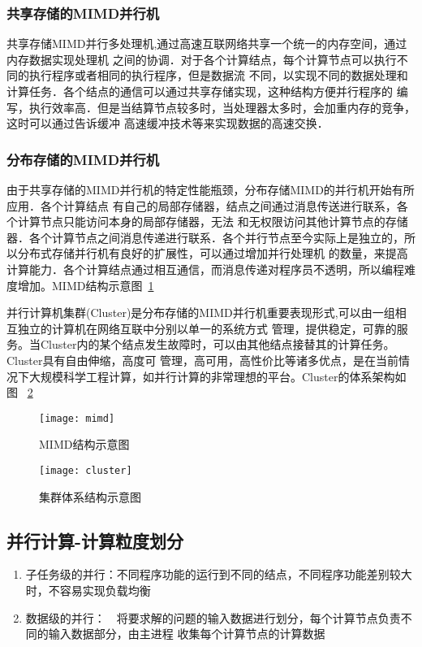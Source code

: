 \subsubsection{共享存储的MIMD并行机}
    共享存储MIMD并行多处理机,通过高速互联网络共享一个统一的内存空间，通过内存数据实现处理机
之间的协调．对于各个计算结点，每个计算节点可以执行不同的执行程序或者相同的执行程序，但是数据流
不同，以实现不同的数据处理和计算任务．各个结点的通信可以通过共享存储实现，这种结构方便并行程序的
编写，执行效率高．但是当结算节点较多时，当处理器太多时，会加重内存的竞争，这时可以通过告诉缓冲
高速缓冲技术等来实现数据的高速交换．
\subsubsection{分布存储的MIMD并行机}
    由于共享存储的MIMD并行机的特定性能瓶颈，分布存储MIMD的并行机开始有所应用．各个计算结点
有自己的局部存储器，结点之间通过消息传送进行联系，各个计算节点只能访问本身的局部存储器，无法
和无权限访问其他计算节点的存储器．各个计算节点之间消息传递进行联系．各个并行节点至今实际上是独立的，所以分布式存储并行机有良好的扩展性，可以通过增加并行处理机
的数量，来提高计算能力．各个计算结点通过相互通信，而消息传递对程序员不透明，所以编程难度增加。MIMD结构示意图~\ref{fig:mimd}

    并行计算机集群(Cluster)是分布存储的MIMD并行机重要表现形式,可以由一组相互独立的计算机在网络互联中分别以单一的系统方式
管理，提供稳定，可靠的服务。当Cluster内的某个结点发生故障时，可以由其他结点接替其的计算任务。Cluster具有自由伸缩，高度可
管理，高可用，高性价比等诸多优点，是在当前情况下大规模科学工程计算，如并行计算的非常理想的平台。Cluster的体系架构如图
~\ref{fig:cluster}
    \begin{figure}[htbp]
    \centering
    \texttt{[image: mimd]}
    \caption{MIMD结构示意图}\label{fig:mimd}
    \vspace{\baselineskip}
    \end{figure}

    \begin{figure}[htbp]
    \centering
    \texttt{[image: cluster]}
    \caption{集群体系结构示意图}\label{fig:cluster}
    \vspace{\baselineskip}
    \end{figure}

\subsection{并行计算-计算粒度划分}     
    \begin{enumerate}
    \item 子任务级的并行：不同程序功能的运行到不同的结点，不同程序功能差别较大时，不容易实现负载均衡
    \item 数据级的并行：　将要求解的问题的输入数据进行划分，每个计算节点负责不同的输入数据部分，由主进程
收集每个计算节点的计算数据
    \end{enumerate}



